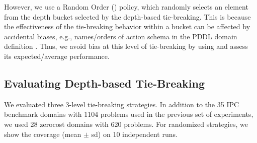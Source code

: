 However, 
we use a Random Order (\ro) policy, which 
randomly selects an element from the depth bucket selected by the depth-based tie-breaking.
This is because the effectiveness of the tie-breaking behavior within a bucket
can be affected by accidental biases, e.g., names/orders of action schema in the PDDL domain
definition \cite{vallati2015effective}.
Thus, we avoid bias at this level of tie-breaking by using \ro and assess its expected/average
performance.





\subsection{Evaluating Depth-based Tie-Breaking}
\label{sec:depth-based-evaluation}
We evaluated three 3-level tie-breaking strategies.
% 
In addition to the 35 IPC benchmark domains with 1104 problems used in
the previous set of experiments, we used 28 zerocost domains with 620
problems. For randomized strategies, we
show the coverage (mean $\pm$ sd) on
10 independent runs.


